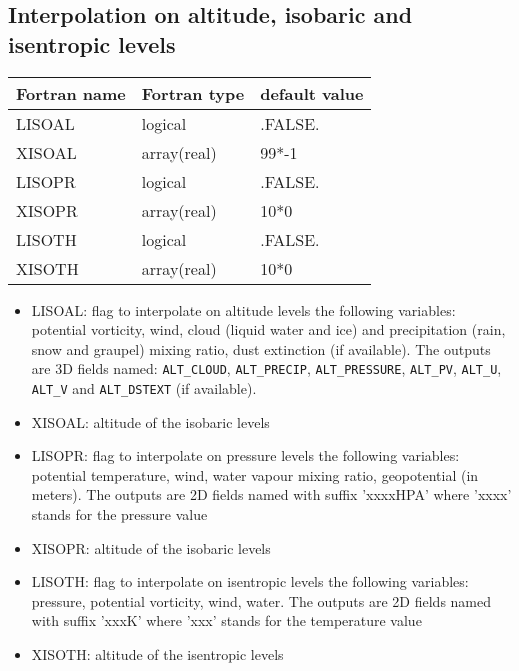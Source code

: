 \subsection{Interpolation on altitude, isobaric and isentropic levels}
\begin{center}
\begin{tabular} {|l|l|l|}
\hline
Fortran name  & Fortran type & default value \\
\hline
LISOAL       & logical     & .FALSE.   \\
XISOAL       & array(real) & 99*-1  \\
LISOPR       & logical     & .FALSE.   \\
XISOPR       & array(real) & 10*0  \\
LISOTH       & logical     & .FALSE.   \\
XISOTH       & array(real) & 10*0  \\
\hline
\end{tabular}
\end{center}
\begin{itemize}
\item LISOAL: flag to interpolate on altitude levels the following variables: potential vorticity, wind, cloud (liquid water and ice) and precipitation (rain, snow and graupel) mixing ratio, dust extinction (if available). The outputs are 3D fields named: {\tt ALT\_CLOUD}, {\tt ALT\_PRECIP}, {\tt ALT\_PRESSURE}, {\tt ALT\_PV}, {\tt ALT\_U}, {\tt ALT\_V} and {\tt ALT\_DSTEXT} (if available).
\item XISOAL: altitude of the isobaric levels
\item LISOPR: flag to interpolate on pressure levels the following variables: potential temperature, wind, water vapour mixing ratio, geopotential (in meters). The outputs are 2D fields named with suffix 'xxxxHPA' where 'xxxx' stands for the pressure value
\item XISOPR: altitude of the isobaric levels
\item LISOTH: flag to interpolate on isentropic levels the following variables: pressure, potential vorticity, wind, water. The outputs are 2D fields named with suffix 'xxxK' where 'xxx' stands for the temperature value
\item XISOTH: altitude of the isentropic levels
\end{itemize}

